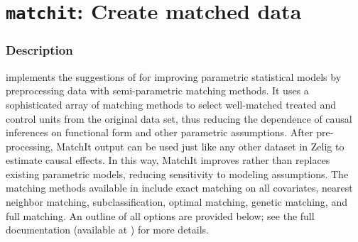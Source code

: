 \section{{\tt matchit}: Create matched data}\label{matchit}

\subsubsection{Description}

 implements the
suggestions of \cite{HoImaKin05b} for improving parametric statistical
models by preprocessing data with semi-parametric matching methods. It
uses a sophisticated array of matching methods to select well-matched
treated and control units from the original data set, thus reducing
the dependence of causal inferences on functional form and other
parametric assumptions.  After pre-processing, MatchIt output can be
used just like any other dataset in Zelig to estimate causal effects.
In this way, MatchIt improves rather than replaces existing parametric
models, reducing sensitivity to modeling assumptions.  The matching
methods available in
 include exact
matching on all covariates, nearest neighbor matching,
subclassification, optimal matching, genetic matching, and full
matching.  An outline of all options are provided below; see the full
documentation (available at
)
for more details.




